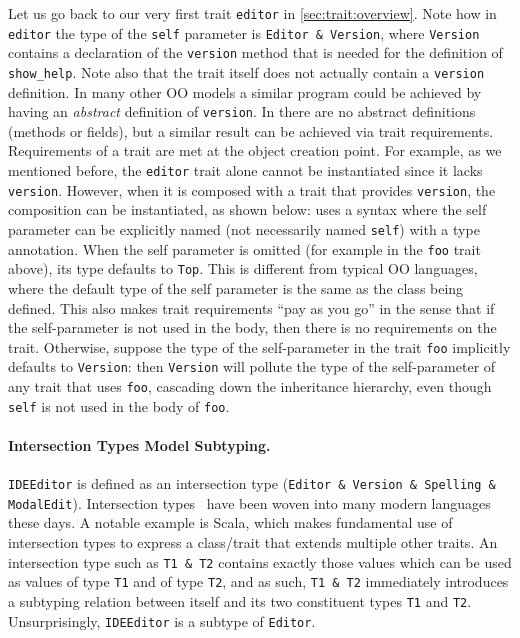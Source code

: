 Let us go back to our very first trait \lstinline{editor} in
\cref{sec:trait:overview}. Note how in \lstinline{editor} the type of the
\lstinline{self} parameter is \lstinline{Editor & Version}, where
\lstinline{Version} contains a declaration of the \lstinline{version} method
that is needed for the definition of \lstinline{show_help}. Note also that the
trait itself does not actually contain a \lstinline{version} definition. In many
other OO models a similar program could be achieved by having an \emph{abstract}
definition of \lstinline{version}. In \sedel there are no abstract definitions
(methods or fields), but a similar result can be achieved via trait
requirements. Requirements of a trait are met at the object creation point. For
example, as we mentioned before, the \lstinline{editor} trait alone cannot be
instantiated since it lacks \lstinline{version}. However, when it is composed
with a trait that provides \lstinline{version}, the composition can be
instantiated, as shown below:
\sedel uses a syntax where the self parameter can be explicitly named (not
necessarily named \lstinline{self}) with a type annotation. When the self
parameter is omitted (for example in the \lstinline{foo} trait above), its type
defaults to \lstinline{Top}. This is different from typical OO languages, where
the default type of the self parameter is the same as the class being defined.
This also makes trait requirements ``pay as you go'' in the sense that if the
self-parameter is not used in the body, then there is no requirements on the
trait. Otherwise, suppose the type of the self-parameter in the trait
\lstinline{foo} implicitly defaults to \lstinline{Version}:
then \lstinline{Version} will pollute the type of the self-parameter of any trait that
uses \lstinline{foo}, cascading down the inheritance hierarchy, even though \lstinline{self}
is not used in the body of \lstinline{foo}.



\paragraph{Intersection Types Model Subtyping.}
\lstinline{IDEEditor} is defined as an intersection type (\lstinline{Editor & Version & Spelling & ModalEdit}).
Intersection types~\citep{coppo1981functional,pottinger1980type} have been woven
into many modern languages these days. A notable example is Scala, which makes
fundamental use of intersection types to express a class/trait that extends
multiple other traits. An intersection type such as \lstinline{T1 & T2} contains
exactly those values which can be used as values of type \lstinline{T1} and of
type \lstinline{T2}, and as such, \lstinline{T1 & T2} immediately introduces a
subtyping relation between itself and its two constituent types \lstinline{T1}
and \lstinline{T2}. Unsurprisingly, \lstinline{IDEEditor} is a subtype of
\lstinline{Editor}.


